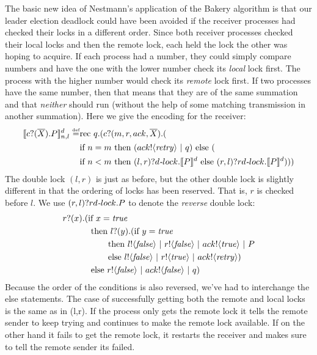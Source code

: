 The basic new idea of Nestmann's application of the Bakery algorithm is that our leader election deadlock could have been avoided if the receiver processes had checked their locks in a different order.  
Since both receiver processes checked their local locks and then the remote lock, each held the lock the other was hoping to acquire.  
If each process had a number, they could simply compare numbers and have the one with the lower number check its \emph{local} lock first.  
The process with the higher number would check its \emph{remote} lock first.  
If two processes have the same number, then that means that they are of the same summation and that \emph{neither} should run (without the help of some matching transmission in another summation).  
Here we give the encoding for the receiver:
\begin{equation*}\begin{split}
	\llbracket{ \ensuremath{{c}?({\overline{X}}).} P}\rrbracket^d_{n,l} \overset{\mbox{\tiny{def}}}{=} & \text{rec }{q}.({c}?({m,r,ack,\overline{X}}).(\\
	&\text{if } {n=m} \text{ then } ({ack}!\langle{ \ensuremath{\text{\emph{retry}}} }\rangle\ |\  q) \text{ else }(\\
	&\text{if } {n<m} \text{ then } (l,r)?d\mbox{\emph{-}}lock.\llbracket{P}\rrbracket^d \text{ else } (r,l)?rd\mbox{\emph{-}}lock.\llbracket{P}\rrbracket^d)))\\
\end{split}\end{equation*}
The double lock $(l,r)$ is just as before, but the other double lock is slightly different in that the ordering of locks has been reserved.  That is, $r$ is checked before $l$.  We use $(r,l)?rd\mbox{\emph{-}}lock.P$ to denote the \emph{reverse} double lock:
\begin{equation*}\begin{split}
	{r}?({x}).(&\text{if } {x= \ensuremath{\text{\emph{true}}} }\\
	&\text{ then } {l}?({y}). (\text{if } {y= \ensuremath{\text{\emph{true}}} }\\
	&\ \ \ \ \ \ \text{ then } {l}!\langle{ \ensuremath{\text{\emph{false}}} }\rangle \ |\  {r}!\langle{ \ensuremath{\text{\emph{false}}} }\rangle \ |\  {ack}!\langle{ \ensuremath{\text{\emph{true}}} }\rangle \ |\  P\\
	&\ \ \ \ \ \ \text{ else } {l}!\langle{ \ensuremath{\text{\emph{false}}} }\rangle \ |\  {r}!\langle{ \ensuremath{\text{\emph{true}}} }\rangle \ |\  {ack}!\langle{ \ensuremath{\text{\emph{retry}}} }\rangle)\\
	&\text{ else }{r}!\langle{ \ensuremath{\text{\emph{false}}} }\rangle \ |\  {ack}!\langle{ \ensuremath{\text{\emph{false}}} }\rangle\ |\  q)\\
\end{split}\end{equation*}%
Because the order of the conditions is also reversed, we've had to interchange the else statements.  The case of successfully getting both the remote and local locks is the same as in (l,r).  If the process only gets the remote lock it tells the remote sender to keep trying and continues to make the remote lock available.  If on the other hand it fails to get the remote lock, it restarts the receiver and makes sure to tell the remote sender its failed.

